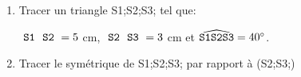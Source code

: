 \documentclass[exercice]{thedocument}%
\begin{document}
%
\begin{enumerate}
    \item Tracer un triangle \textsf{\<S1;\<S2;\<S3;} tel que:
    \begin{center}
        $\textsf{\<S1;\<S2;}=5$ cm, $\textsf{\<S2;\<S3;}=3$ cm et
        $\widehat{\<S1;\<S2;\<S3;}=40^\circ$.
    \end{center}
    \item Tracer le symétrique de \textsf{\<S1;\<S2;\<S3;} par rapport
    à (\<S2;\<S3;)
\end{enumerate}
\end{document}
